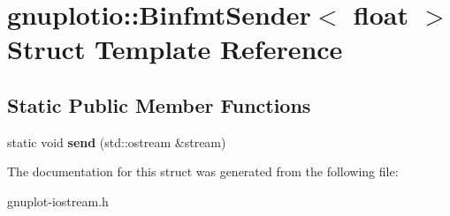 \hypertarget{structgnuplotio_1_1BinfmtSender_3_01float_01_4}{}\section{gnuplotio\+:\+:Binfmt\+Sender$<$ float $>$ Struct Template Reference}
\label{structgnuplotio_1_1BinfmtSender_3_01float_01_4}
\subsection*{Static Public Member Functions}
\begin{DoxyCompactItemize}
\item 
\mbox{\label{structgnuplotio_1_1BinfmtSender_3_01float_01_4_ae9c6a1915ee24e54ea5ed1a22c54fee1}} 
static void {\bfseries send} (std\+::ostream \&stream)
\end{DoxyCompactItemize}


The documentation for this struct was generated from the following file\+:\begin{DoxyCompactItemize}
\item 
gnuplot-\/iostream.\+h\end{DoxyCompactItemize}
